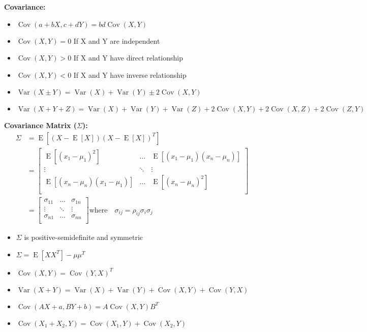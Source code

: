 \documentclass{../cheat}
\begin{document}
\begin{multicols}{3}
	\textbf{Covariance:}
	\begin{itemize}[nolistsep, leftmargin=1em]
		\item $\operatorname{Cov}(a +bX ,c +dY ) =bd \operatorname{Cov}(X,Y)$
		\item $\operatorname{Cov}(X,Y)=0$ If X and Y are independent
		\item $\operatorname{Cov}(X,Y)>0$ If X and Y have direct relationship
		\item $\operatorname{Cov}(X,Y)<0$ If X and Y have inverse relationship
		\item $ \operatorname{Var}(X \pm Y) = \operatorname{Var}(X)+ \operatorname{Var}(Y) \pm 2\operatorname{Cov}(X,Y)$
		\item $ \operatorname{Var}(X+Y+Z) =  \operatorname{Var}(X)+ \operatorname{Var}(Y)+ \operatorname{Var}(Z)+2\operatorname{Cov}(X,Y)+2\operatorname{Cov}(X,Z) + 2\operatorname{Cov}(Z,Y)$
	\end{itemize}
	
	\textbf{Covariance Matrix ($\Sigma$):}
	\begin{align*}
		\Sigma&=\operatorname{E}[(X-\operatorname{E}[X])(X-\operatorname{E}[X])^T]\nonumber\\
		{} &=\left[\begin{array}{ccc}
			\operatorname{E}[(x_1-\mu_1)^2] & \ldots & \operatorname{E}[(x_1-\mu_1)(x_n-\mu_n)] \\
			\vdots & \ddots & \vdots \\
			\operatorname{E}[(x_n-\mu_n)(x_1-\mu_1)] & \ldots & \operatorname{E}[(x_n-\mu_n)^2]\\
		\end{array}\right]\nonumber\\
		{} &=\left[\begin{array}{ccc}
			\sigma_{11} & \ldots & \sigma_{1n} \\
			\vdots & \ddots & \vdots \\
			\sigma_{n1} & \ldots & \sigma_{nn}\\
		\end{array}\right] \text{where} \quad \sigma_{ij}=\rho_{ij}\sigma_i\sigma_j
	\end{align*}

			\begin{itemize}[nolistsep, leftmargin=1em]
		\item $\Sigma$ is positive-semidefinite and symmetric
		\item $\Sigma = \operatorname{E}[XX^T] -\mu\mu^T$
		\item {}  $\operatorname{Cov}(X,Y) = \operatorname{Cov}(Y,X)^T$
		\item $\operatorname{Var}(X+Y) = \operatorname{Var}(X) + \operatorname{Var}(Y) + \operatorname{Cov}(X,Y) + \operatorname{Cov}(Y,X)$
		\item $\operatorname{Cov}(AX+a ,BY+b) = A \operatorname{Cov}(X,Y)B^T$
		\item $\operatorname{Cov}(X_1+X_2 ,Y) = \operatorname{Cov}(X_1,Y)+\operatorname{Cov}(X_2,Y)$
	\end{itemize}


\end{multicols}
\end{document}
